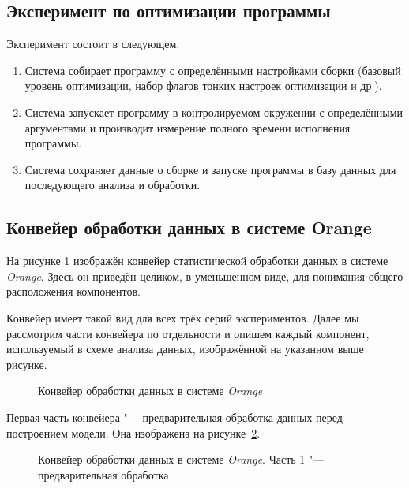 \subsection{Эксперимент по оптимизации программы}
Эксперимент состоит в следующем.

\begin{enumerate}
	\item Система собирает программу с определёнными настройками сборки (базовый уровень оптимизации, набор флагов тонких настроек оптимизации и др.).

	\item Система запускает программу в контролируемом окружении с определёнными аргументами и производит измерение полного времени исполнения программы.

	\item Система сохраняет данные о сборке и запуске программы в базу данных для последующего анализа и обработки.
\end{enumerate}

\subsection{Конвейер обработки данных в системе Orange}
\label{orange-pipeline}

На рисунке \ref{img:series30} изображён конвейер статистической обработки данных в системе \textit{Orange}. Здесь он приведён целиком, в уменьшенном виде, для понимания общего расположения компонентов.

Конвейер имеет такой вид для всех трёх серий экспериментов. Далее мы рассмотрим части конвейера по отдельности и опишем каждый компонент, используемый в схеме анализа данных, изображённой на указанном выше рисунке.

\begin{figure}
    \caption{Конвейер обработки данных в системе \textit{Orange}}
    \label{img:series30}
\end{figure}

Первая часть конвейера "--- предварительная обработка данных перед построением модели. Она изображена на рисунке~\ref{img:series30-1}.

\begin{figure}
    \caption{Конвейер обработки данных в системе \textit{Orange}. Часть 1 "--- предварительная обработка}
    \label{img:series30-1}
\end{figure}

